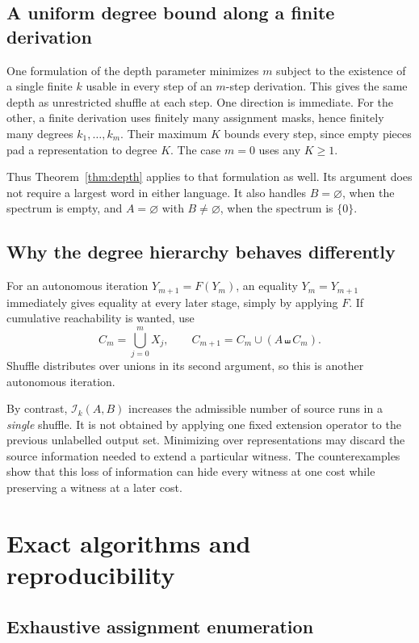 \documentclass[11pt,letterpaper]{article}
\theoremstyle{definition}\newtheorem{definition}[theorem]{Definition}
\theoremstyle{remark}\newtheorem{remark}[theorem]{Remark}
\theoremstyle{definition}\newtheorem{question}[theorem]{Question}
\newcommand{\sh}{\mathbin{\shuffle}}
\newcommand{\ins}[3]{\mathcal I_{#1}(#2,#3)}
\begin{document}
\subsection{A uniform degree bound along a finite derivation}

One formulation of the depth parameter minimizes $m$ subject to the existence of a single finite $k$ usable in every step of an $m$-step derivation. This gives the same depth as unrestricted shuffle at each step. One direction is immediate. For the other, a finite derivation uses finitely many assignment masks, hence finitely many degrees $k_1,\ldots,k_m$. Their maximum $K$ bounds every step, since empty pieces pad a representation to degree $K$. The case $m=0$ uses any $K\geq1$.

Thus Theorem~\ref{thm:depth} applies to that formulation as well. Its argument does not require a largest word in either language. It also handles $B=\varnothing$, when the spectrum is empty, and $A=\varnothing$ with $B\neq\varnothing$, when the spectrum is $\{0\}$.

\subsection{Why the degree hierarchy behaves differently}

For an autonomous iteration $Y_{m+1}=F(Y_m)$, an equality $Y_m=Y_{m+1}$ immediately gives equality at every later stage, simply by applying $F$. If cumulative reachability is wanted, use
\[
 C_m=\bigcup_{j=0}^mX_j,\qquad C_{m+1}=C_m\cup(A\sh C_m).
\]
Shuffle distributes over unions in its second argument, so this is another autonomous iteration.

By contrast, $\ins{k}{A}{B}$ increases the admissible number of source runs in a \emph{single} shuffle. It is not obtained by applying one fixed extension operator to the previous unlabelled output set. Minimizing over representations may discard the source information needed to extend a particular witness. The counterexamples show that this loss of information can hide every witness at one cost while preserving a witness at a later cost.

\section{Exact algorithms and reproducibility}\label{sec:algorithms}

\subsection{Exhaustive assignment enumeration}
\end{document}
